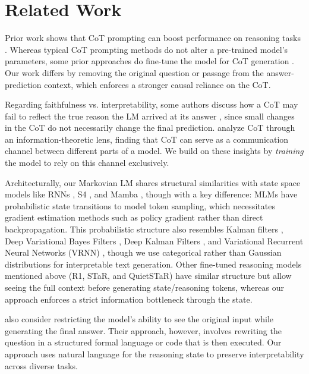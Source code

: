 \documentclass{article} %
\begin{document}
\section{Related Work}
\label{sec:related_work}

Prior work shows that CoT prompting can boost performance on reasoning tasks \citep{wei2022chain, nye2022show}.
Whereas typical CoT prompting methods do not alter a pre-trained model's parameters, some prior approaches do fine-tune the model for CoT generation \citep{eric_star2022, zelikman2024quietstar, deepseekai2025}. Our work differs by removing the original question or passage from the answer-prediction context, which enforces a stronger causal reliance on the CoT.

Regarding faithfulness vs. interpretability, some authors discuss how a CoT may fail to reflect the true reason the LM arrived at its answer \citep{lanham2023measuring, turpin2023language}, since small changes in the CoT do not necessarily change the final prediction. \citet{zhou2023understanding} analyze CoT through an information-theoretic lens, finding that CoT can serve as a communication channel between different parts of a model. We build on these insights by \emph{training} the model to rely on this channel exclusively.

Architecturally, our Markovian LM shares structural similarities with state space models like RNNs \citep{rumelhart1986learning}, S4 \citep{gu2022efficientlymodelinglongsequences}, and Mamba \citep{gu2024mamba}, though with a key difference: MLMs have probabilistic state transitions to model token sampling, which necessitates gradient estimation methods such as policy gradient \citep{policy_gradient} rather than direct backpropagation. This probabilistic structure also resembles Kalman filters \citep{proto_pomdp1965}, Deep Variational Bayes Filters \citep{karl2017deepvariationalbayesfilters}, Deep Kalman Filters \citep{krishnan2015deepkalmanfilters}, and Variational Recurrent Neural Networks (VRNN) \citep{DBLP:journals/corr/ChungKDGCB15}, though we use categorical rather than Gaussian distributions for interpretable text generation. Other fine-tuned reasoning models mentioned above (R1, STaR, and QuietSTaR) have similar structure but allow seeing the full context before generating state/reasoning tokens, whereas our approach enforces a strict information bottleneck through the state.

\citet{lyu2023faithful} also consider restricting the model's ability to see the original input while generating the final answer. Their approach, however, involves rewriting the question in a structured formal language or code that is then executed. Our approach uses natural language for the reasoning state to preserve interpretability across diverse tasks.
\end{document}

